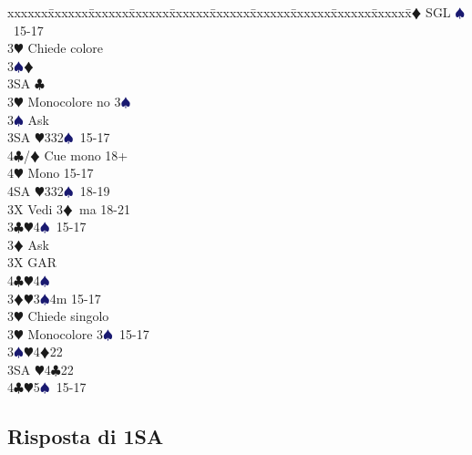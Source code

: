 \documentclass[a4paper,italian]{article}
\newcommand{\BC}{\textcolor{OliveGreen}{$\clubsuit$}}
\newcommand{\BD}{\textcolor{RedOrange}{$\vardiamondsuit$}}
\newcommand{\BH}{\textcolor{Red2}{$\varheartsuit${}}}
\newcommand{\BS}{\textcolor{MidnightBlue}{$\spadesuit${}}}
\newenvironment{bidtable}
{\begin{tabbing}

    xxxxxx\=xxxxxx\=xxxxxx\=xxxxxx\=xxxxxx\=xxxxxx\=xxxxxx\=xxxxxx\=xxxxxx\=xxxxxx\=\kill}
{\end{tabbing} }%
\begin{document}
\begin{multicols*}{2}
\begin{bidtable}
                                            3\BD \> SGL \BS\ 15-17\+\\
                                            3\BH \> Chiede colore\+\\
                                            3\BS {}\BD \\
                                            3SA \BC \-\-\\
                                            3\BH \> Monocolore no 3\BS \+\\
                                            3\BS \> Ask\+\\
                                            3SA \BH 332\BS\ 15-17\\
                                            4\BC/\BD \> Cue mono 18+\\
                                            4\BH \> Mono 15-17\\
                                            4SA \BH 332\BS\ 18-19\-\-\\
                                            3X \> Vedi 3\BD\ ma 18-21\-\-\\
                                            3\BC {}\BH 4\BS\ 15-17\+\\
                                            3\BD \> Ask\+\\
                                            3X \> GAR\\
                                            4\BC {}\BH 4\BS \-\-\\
                                            3\BD {}\BH 3\BS 4m 15-17\+\\
                                            3\BH \> Chiede singolo\-\\
                                            3\BH \> Monocolore 3\BS\ 15-17\\
                                            3\BS {}\BH 4\BD 22\\
                                            3SA \BH 4\BC 22\\
                                            4\BC {}\BH 5\BS\ 15-17\-\\
                                        \end{bidtable}
                                        \columnbreak

                                        \subsection{Risposta di 1SA}


\end{multicols*}
\end{document}
